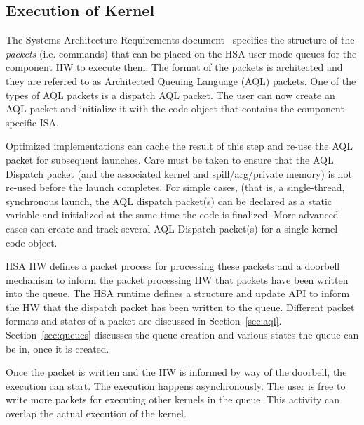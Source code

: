 \documentclass[final]{book}
\begin{document}
\subsection{Execution of Kernel}
The Systems Architecture Requirements document~\cite{sar} specifies the
structure of the \emph{packets} (i.e. commands) that can be placed on the HSA
user mode queues for the component HW to execute them. The format of the packets
is architected and they are referred to as Architected Queuing Language (AQL)
packets. One of the types of AQL packets is a dispatch AQL packet. The user can
now create an AQL packet and initialize it with the code object that contains
the component-specific ISA. %

Optimized implementations can cache the result of this step and re-use the AQL
packet for subsequent launches. Care must be taken to ensure that the AQL
Dispatch packet (and the associated kernel and spill/arg/private memory) is not
re-used before the launch completes. For simple cases, (that is, a
single-thread, synchronous launch, the AQL dispatch packet(s) can be declared
as a static variable and initialized at the same time the code is
finalized. More advanced cases can create and track several AQL Dispatch
packet(s) for a single kernel code object.

HSA HW defines a packet process for processing these packets and a doorbell
mechanism to inform the packet processing HW that packets have been written into
the queue. The HSA runtime defines a structure and update API to inform the HW
that the dispatch packet has been written to the queue. Different packet formats
and states of a packet are discussed in
Section~\ref{sec:aql}. Section~\ref{sec:queues} discusses the queue creation
and various states the queue can be in, once it is created.

Once the packet is written and the HW is informed by way of the doorbell, the
execution can start. The execution happens asynchronously. The user is free to
write more packets for executing other kernels in the queue. This activity can
overlap the actual execution of the kernel.
\end{document}

